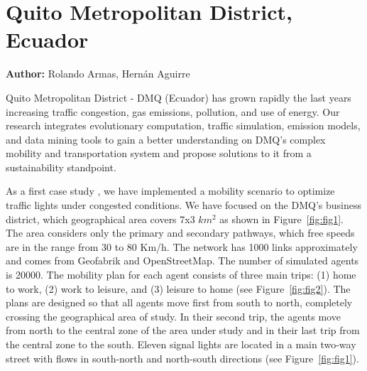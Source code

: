 \section{Quito Metropolitan District, Ecuador}
\label{sec:quito}
\hfill \textbf{Author:} Rolando Armas, Hernán Aguirre

Quito Metropolitan District - DMQ (Ecuador) has grown rapidly the last years increasing traffic congestion, gas emissions, pollution, and use of energy. Our research integrates evolutionary computation, traffic simulation, emission models, and data mining tools to gain a better understanding on DMQ’s complex mobility and transportation system and propose solutions to it from a sustainability standpoint.

As a first case study \citep[][]{ArmasEtAl_SEAL_2014}, we have implemented a mobility scenario to optimize traffic lights under congested conditions. We have focused on the
DMQ’s business district, which geographical area covers 7x3 $km^2$ as shown in Figure~\ref{fig:fig1}. The area considers only the primary and secondary pathways, which free speeds are in the range from 30 to 80 Km/h. The network has 1000 links approximately and comes from Geofabrik and OpenStreetMap. The number of simulated agents is 20000. The mobility plan for each agent consists of three main trips: (1) home to work, (2) work to leisure, and (3) leisure to home (see Figure~\ref{fig:fig2}). The plans are designed so that all agents move first from south to north, completely crossing the geographical area of study. In their second trip, the agents move from north to the central zone of the area under study and in their last trip from the central zone to the south. Eleven signal lights are located in a main two-way street with flows in south-north and north-south directions (see Figure~\ref{fig:fig1}).

